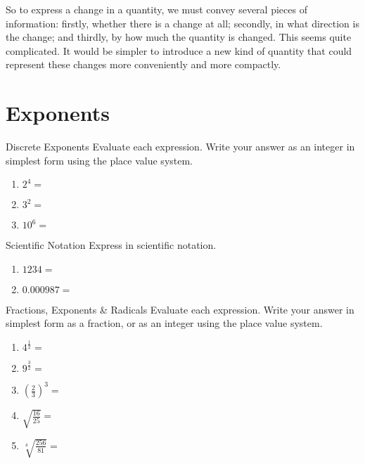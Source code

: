 \documentclass[12pt,a4paper]{report}
\begin{document}
So to express a change in a quantity, we must convey several pieces of
information: firstly, whether there is a change at all; secondly, in what
direction is the change; and thirdly, by how much the quantity is changed. This
seems quite complicated. It would be simpler to introduce a new kind of
quantity that could represent these changes more conveniently and more
compactly.

\section{Exponents}

\begin{problem}{Discrete Exponents}
 Evaluate each expression. Write your answer as an integer in simplest form
 using the place value system.

 \begin{enumerate}[\hspace{.5cm}a.]
  \item $2^4=$ \hfill\blankC
  \item $3^2=$ \hfill\blankC
  \item $10^6=$ \hfill\blankF
 \end{enumerate}
\end{problem}

\begin{problem}{Scientific Notation}
 Express in scientific notation.

 \begin{enumerate}[\hspace{.5cm}a.]
  \item $1234=$ \hfill\blankF
  \item $0.000987=$ \hfill\blankF
 \end{enumerate}
\end{problem}

\begin{problem}{Fractions, Exponents \& Radicals}
 Evaluate each expression. Write your answer in simplest form as a fraction, or
 as an integer using the place value system.

 \begin{enumerate}[\hspace{.5cm}a.]
  \item $4^{\frac{1}{2}}=$ \hfill\blankC
  \item $9^{\frac{3}{2}}=$ \hfill\blankC
  \item ${\left(\frac{2}{3}\right)}^3=$ \hfill\blankC
  \item $\sqrt{\frac{16}{25}}=$ \hfill\blankC
  \item $\sqrt[4]{\frac{256}{81}}=$ \hfill\blankC
 \end{enumerate}
\end{problem}
\end{document}

